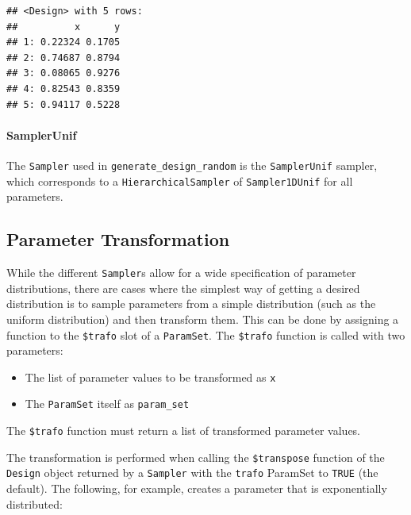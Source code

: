 \documentclass[
]{scrbook}
\providecommand{\tightlist}{%
  \setlength{\itemsep}{0pt}\setlength{\parskip}{0pt}}
\begin{document}
\begin{verbatim}
## <Design> with 5 rows:
##          x      y
## 1: 0.22324 0.1705
## 2: 0.74687 0.8794
## 3: 0.08065 0.9276
## 4: 0.82543 0.8359
## 5: 0.94117 0.5228
\end{verbatim}

\hypertarget{samplerunif}{%
\paragraph{SamplerUnif}\label{samplerunif}}

The \texttt{Sampler} used in \texttt{generate\_design\_random} is the \texttt{SamplerUnif} sampler, which corresponds to a \texttt{HierarchicalSampler} of \texttt{Sampler1DUnif} for all parameters.

\hypertarget{parameter-transformation}{%
\subsection{Parameter Transformation}\label{parameter-transformation}}

While the different \texttt{Sampler}s allow for a wide specification of parameter distributions, there are cases where the simplest way of getting a desired distribution is to sample parameters from a simple distribution (such as the uniform distribution) and then transform them.
This can be done by assigning a function to the \texttt{\$trafo} slot of a \texttt{ParamSet}.
The \texttt{\$trafo} function is called with two parameters:

\begin{itemize}
\tightlist
\item
  The list of parameter values to be transformed as \texttt{x}
\item
  The \texttt{ParamSet} itself as \texttt{param\_set}
\end{itemize}

The \texttt{\$trafo} function must return a list of transformed parameter values.

The transformation is performed when calling the \texttt{\$transpose} function of the \texttt{Design} object returned by a \texttt{Sampler} with the \texttt{trafo} ParamSet to \texttt{TRUE} (the default).
The following, for example, creates a parameter that is exponentially distributed:
\end{document}
